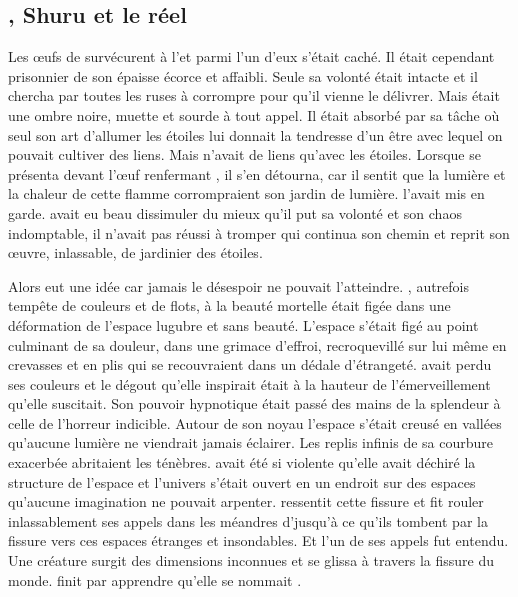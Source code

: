 \subsection{\Ogo, Shuru et le réel}

Les œufs de \Tot survécurent à l'\Extinction et parmi l'un d'eux \Ogo s'était caché. Il était cependant prisonnier de son épaisse écorce et affaibli. Seule sa volonté était intacte et il chercha par toutes les ruses à corrompre \Carac pour qu'il vienne le délivrer. Mais \Carac était une ombre noire, muette et sourde à tout appel. Il était absorbé par sa tâche où seul son art d'allumer les étoiles lui donnait la tendresse d'un être avec lequel on pouvait cultiver des liens. Mais \Carac n'avait de liens qu'avec les étoiles. Lorsque \Carac se présenta devant l'œuf renfermant \Ogo, il s'en détourna, car il sentit que la lumière et la chaleur de cette flamme corrompraient son jardin de lumière. \Cind l'avait mis en garde. \Ogo avait eu beau dissimuler du mieux qu'il put sa volonté et son chaos indomptable, il n'avait pas réussi à tromper \Carac qui continua son chemin et reprit son œuvre, inlassable, de jardinier des étoiles. 


Alors \Ogo eut une idée car jamais le désespoir ne pouvait l'atteindre. \Auga, autrefois tempête de couleurs et de flots, à la beauté mortelle était figée dans une déformation de l'espace lugubre et sans beauté. L'espace s'était figé au point culminant de sa douleur, dans une grimace d'effroi, recroquevillé sur lui même en crevasses et en plis qui se recouvraient dans un dédale d'étrangeté. \Auga avait perdu ses couleurs et le dégout qu'elle inspirait était à la hauteur de l'émerveillement qu'elle suscitait. Son pouvoir hypnotique était passé des mains de la splendeur à celle de l'horreur indicible. Autour de son noyau l'espace s'était creusé en vallées qu'aucune lumière ne viendrait jamais éclairer. Les replis infinis de sa courbure exacerbée abritaient les ténèbres. \Auga avait été si violente qu'elle avait déchiré la structure de l'espace et l'univers s'était ouvert en un endroit sur des espaces qu'aucune imagination ne pouvait arpenter. \Ogo ressentit cette fissure et fit rouler inlassablement ses appels dans les méandres d'\Auga jusqu'à ce qu'ils tombent par la fissure vers ces espaces étranges et insondables. Et l'un de ses appels fut entendu. Une créature surgit des dimensions inconnues et se glissa à travers la fissure du monde. \Ogo finit par apprendre qu'elle se nommait \Shuru.

